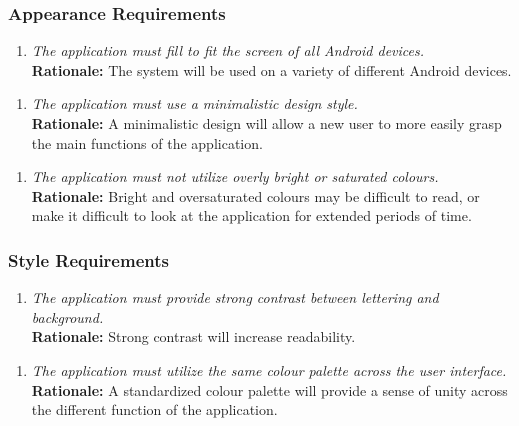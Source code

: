 \documentclass[]{article}
\begin{document}
\begin{enumerate}[{\bf BE1.}]
\subsubsection{Appearance Requirements}
\label{ssub:appearance_requirements}
\begin{enumerate}[{LF-A}1. ]
    \item \emph{The application must fill to fit the screen of all Android devices.}\\
        {\bf Rationale:} The system will be used on a variety of different Android devices.
\end{enumerate}
\begin{enumerate}[{LF-A}2. ]
    \item \emph{The application must use a minimalistic design style.}\\
        {\bf Rationale:} A minimalistic design will allow a new user to more easily grasp the main functions of the application.    
\end{enumerate}
\begin{enumerate}[{LF-A}3. ]
    \item \emph{The application must not utilize overly bright or saturated colours.}\\
        {\bf Rationale:} Bright and oversaturated colours may be difficult to read, or make it difficult to look at the application for extended periods of time.
\end{enumerate}


\subsubsection{Style Requirements}
\label{ssub:style_requirements}
\begin{enumerate}[{LF-S}1. ]
    \item \emph{The application must provide strong contrast between lettering and background.} \\
        {\bf Rationale:} Strong contrast will increase readability.
\end{enumerate}
\begin{enumerate}[{LF-S}2. ]
        \item \emph{The application must utilize the same colour palette across the user interface.} \\
        {\bf Rationale:} A standardized colour palette will provide a sense of unity across the different function of the application.
\end{enumerate}





\end{enumerate}
\end{document}
